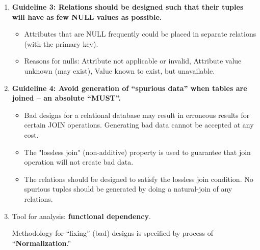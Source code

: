 \documentclass[12pt, landscape]{article}
\begin{document}
\begin{multicols*}{3}
\begin{enumerate}
\item \textbf{Guideline 3: Relations should be designed such that their 
tuples will have as few NULL values as possible. }
\begin{itemize}
\item Attributes that are NULL frequently could be 
placed in separate relations (with the primary key).
\item Reasons for nulls:  Attribute not applicable or invalid, Attribute value unknown (may exist), Value known to exist, but unavailable.
\end{itemize}
\medskip

\item \textbf{Guideline 4: Avoid generation of “spurious data” when tables are joined – an absolute “MUST”.}
\begin{itemize}
\item Bad designs for a relational database may result in 
erroneous results for certain JOIN operations. Generating bad data cannot be accepted at any cost.
\item The "lossless join" (non-additive) property is used to guarantee that join operation will not create bad data. 
\item The relations should be designed to satisfy the 
lossless join condition. No spurious tuples should be generated by doing 
a natural-join of any relations.
\end{itemize}

\medskip

\item Tool for analysis: \textbf{functional dependency}. \smallskip

Methodology for ``fixing'' (bad) designs is specified by process of ``\textbf{Normalization}.''



\end{enumerate}

\null \null

\columnbreak


\end{multicols*}
\end{document}
